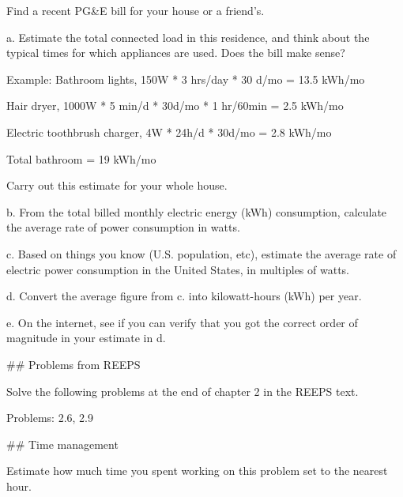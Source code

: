     Find a recent PG&E bill for your house or a friend's.

    a. 	Estimate the total connected load in this residence, and think
    about the typical times for which appliances are used.  Does the
    bill make sense?

    Example: Bathroom lights, 150W * 3 hrs/day * 30 d/mo = 13.5 kWh/mo

    Hair dryer, 1000W * 5 min/d * 30d/mo * 1 hr/60min = 2.5 kWh/mo

    Electric toothbrush charger, 4W * 24h/d * 30d/mo = 2.8 kWh/mo

    Total bathroom = 19 kWh/mo

    Carry out this estimate for your whole house.

    b. From the total billed monthly electric energy (kWh) consumption,
    calculate the average rate of power consumption in watts.

    c. Based on things you know (U.S. population, etc), estimate the
    average rate of electric power consumption in the United States, in
    multiples of watts.

    d. Convert the average figure from c. into kilowatt-hours (kWh) per year.

    e. On the internet, see if you can verify that you got the correct
    order of magnitude in your estimate in d.


## Problems from REEPS

Solve the following problems at the end of chapter 2 in the REEPS text.

Problems:  2.6, 2.9

## Time management

Estimate how much time you spent working on this problem set to the
nearest hour.
